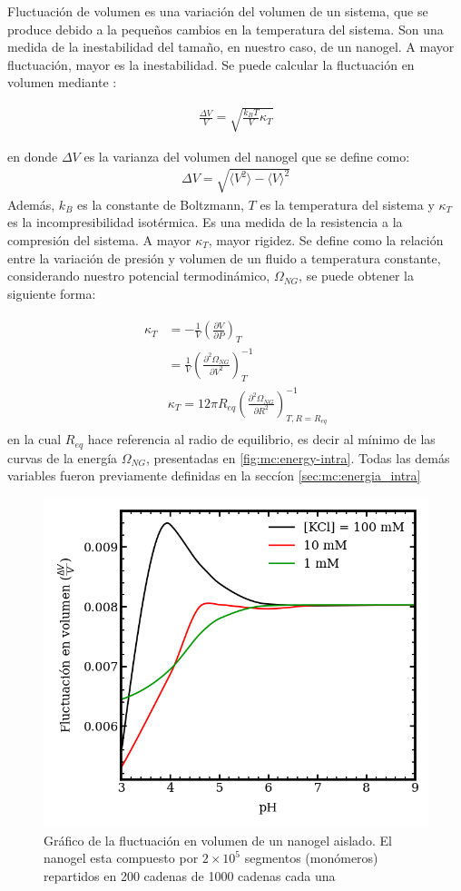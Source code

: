 	Fluctuaci\'on de volumen es una variaci\'on del volumen de un sistema, que se produce debido a la peque\~nos cambios en la temperatura del sistema. Son una medida de la inestabilidad del tama\~no, en nuestro caso, de un nanogel. A mayor fluctuaci\'on, mayor es la inestabilidad.
	Se puede calcular la fluctuaci\'on en volumen mediante \cite{callen1991thermodynamics}:
	
	\begin{align}
		\frac{\Delta V}{V} = \sqrt{\frac{k_BT}{V}\kappa_T}
	\end{align}
	
	\noindent en donde $\Delta V$ es la varianza del volumen del nanogel que se define como:
	\begin{align}
		\Delta V = \sqrt{\langle V^2\rangle - \langle V \rangle^2}
	\end{align}
	Adem\'as, $k_B$ es la constante de Boltzmann, $T$ es la temperatura del sistema y $\kappa_T$ es la incompresibilidad isot\'ermica. Es una medida de la resistencia a la compresi\'on del sistema. A mayor $\kappa_T$, mayor rigidez.
	Se define como la relaci\'on entre la variaci\'on de presi\'on y  volumen de un fluido a temperatura constante, considerando nuestro potencial termodin\'amico, $\Omega_{NG}$, se puede obtener la siguiente forma:
	
	
	\begin{align}
		\begin{aligned}
			\kappa_T & = -\frac{1}{V} \left( \frac{\partial V}{\partial P}\right)_T \\
			& =\frac{1}{V} \left( \frac{\partial^2 \Omega_{NG}}{\partial V^2}\right)^{-1}_T \\
			& \kappa_T  = 12 \pi R_{eq} \left( \frac{\partial^2 \Omega_{NG}}{\partial R^2}\right)^{-1}_{T,R=R_{eq}}
		\end{aligned}
	\end{align}
	\noindent en la cual $R_{eq}$ hace referencia al radio de equilibrio, es decir al m\'inimo de las curvas de la energ\'ia $ \Omega_{NG}$, presentadas en \ref{fig:mc:energy-intra}. Todas las dem\'as variables fueron previamente definidas en la secc\'ion \ref{sec:mc:energia_intra}
	
	\begin{figure}
		\centering
		\includegraphics[width=0.45\linewidth]{Figures/graph-mc/fluct-pH.png}
		\caption{Gr\'afico de la fluctuaci\'on en volumen de un nanogel aislado. El nanogel esta compuesto por $2\times 10^5$ segmentos (mon\'omeros) repartidos en 200 cadenas de 1000 cadenas cada una}
		\label{fig:mc:flut-pH}
	\end{figure}
	
